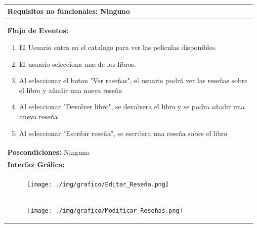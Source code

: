 \documentclass{report}
\begin{document}
\begin{center}
\begin{longtable}{|p{\linewidth}|}
                    \hline
                    \textbf{Requisitos no funcionales:} Ninguno\\
                    \hline
                    \textbf{Flujo de Eventos:}
                    \begin{enumerate}
                        \item El Usuario entra en el catalogo para ver las peliculas disponibles.
                        \item El usuario selecciona uno de los libros.
                    	\item Al seleccionar el boton "Ver reseñas", el usuario podrá ver las reseñas sobre el libro y añadir una nueva reseña
                    	\item Al seleccionar "Devolver libro", se devolvera el libro y se podra añadir una nueva reseña
                    	\item Al seleccionar "Escribir reseña", se escribira una reseña sobre el libro  
                    \end{enumerate}\\
                    \hline
                    \textbf{Poscondiciones:} Ninguna\\
                    \hline
                    \textbf{Interfaz Gráfica:}\\
                    \begin{figure}[H]
                        \centering
                        \texttt{[image: ./img/grafico/Editar\_Reseña.png]}
                    \end{figure}\\
                    \begin{figure}[H]
                        \centering
                        \texttt{[image: ./img/grafico/Modificar\_Reseñas.png]}
                    \end{figure}\\
                    \hline
                \end{longtable}
            \end{center}
\end{document}
